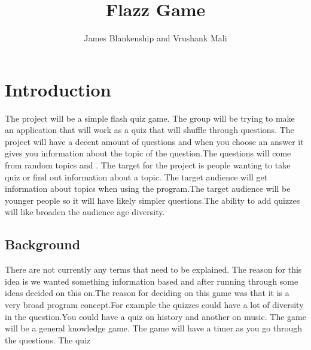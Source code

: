 \documentclass[10pt,conference,onecolumn,compsoc]{IEEEtran}
\begin{document}
\title{Flazz Game \\}
%
%


\author{James Blankenship and Vrushank Mali\\%
}



\maketitle



\IEEEdisplaynontitleabstractindextext

\IEEEpeerreviewmaketitle



\section{Introduction}

The project will be a simple flash quiz game. The group will be trying to make an application that will work as a quiz that will shuffle through questions. The project will  have a decent amount of questions and when you choose an answer it gives you information about  the topic of the question.The questions will come from random topics  and . The target for the project is people wanting to take quiz or find out information about a topic. The target audience will get information about topics when using the program.The target audience will be younger people so it will have likely simpler questions.The ability to add quizzes will like broaden the audience age diversity.


\subsection{Background}
There are not currently any terms that need to be explained. The reason for this idea is we wanted something information based and after running through some ideas decided on this on.The reason for deciding on this game was that it is a very broad program concept.For example the quizzes could have a lot of diversity in the question.You could have a quiz on history and another  on music. The game will be a general knowledge game.
The game will have a timer as you go through the questions. The quiz 
\end{document}
